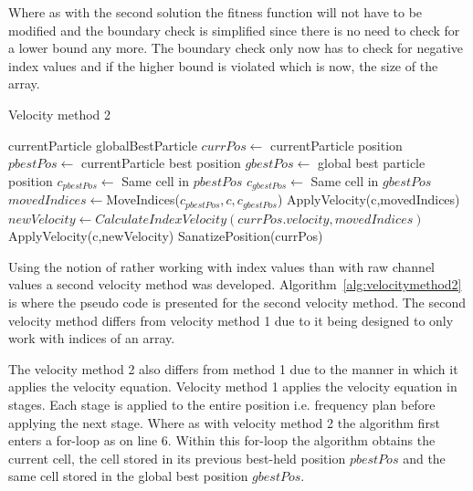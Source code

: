 Where as with the second solution the fitness function will not have to be modified and the boundary check is simplified since there is no need to check for a lower bound any more. The boundary check only now has to check for negative index values and if the higher bound is violated which is now, the size of the array.
\begin{algorithm}
\caption{Velocity method 2}
\label{alg:velocitymethod2}
\begin{algorithmic}[1]
	\REQUIRE currentParticle
	\REQUIRE globalBestParticle
	\STATE $currPos \leftarrow$ currentParticle position
	\STATE $pbestPos \leftarrow$ currentParticle best position
	\STATE $gbestPos \leftarrow$ global best particle position
		\STATE $c_{pbestPos} \leftarrow $ Same cell in $pbestPos$
		\STATE $c_{gbestPos} \leftarrow $ Same cell in $gbestPos$
		\STATE $movedIndices \leftarrow $MoveIndices($c_{pbestPos},c,c_{gbestPos}$)
			\STATE ApplyVelocity(c,movedIndices)
		\ELSE
			\STATE $newVelocity \leftarrow CalculateIndexVelocity(currPos.velocity,movedIndices)$
			\STATE ApplyVelocity(c,newVelocity)
		\ENDIF
	\ENDFOR
	\STATE SanatizePosition(currPos)
\end{algorithmic}
\end{algorithm}
Using the notion of rather working with index values than with raw channel values a second velocity method was developed. Algorithm~\ref{alg:velocitymethod2} is where the pseudo code is presented for the second velocity method. The second velocity method differs from velocity method 1 due to it being designed to only work with indices of an array.

The velocity method 2 also differs from method 1 due to the manner in which it applies the velocity equation. Velocity method 1 applies the velocity equation in stages. Each stage is applied to the entire position i.e. frequency plan before applying the next stage. Where as with velocity method 2 the algorithm first enters a for-loop as on line 6. Within this for-loop the algorithm obtains the current cell, the cell stored in its previous best-held position $pbestPos$ and the same cell stored in the global best position $gbestPos$.


